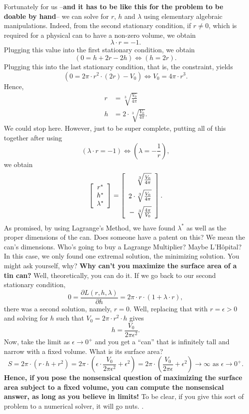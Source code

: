 Fortunately for us --\textbf{and it has to be like this for the problem to be doable by hand}-- we can solve for $r$, $h$ and $\lambda$ using elementary algebraic manipulations. Indeed, from the second stationary condition, if $r \neq 0$, which is required for a physical can to have a non-zero volume, we obtain 
$$
\lambda \cdot r = -1. 
$$
Plugging this value into the first  stationary condition, we obtain 
$$(0= h + 2r - 2 h ) \iff  (h = 2r).$$
Plugging this into the last stationary condition, that is, the constraint, yields
$$\left(  0 =  2 \pi \cdot r^2 \cdot (2 r) - V_0\right) \iff V_0 = 4 \pi \cdot r^3.$$
Hence, 
\begin{align*}
    r & = \sqrt[3]{\frac{V_0}{4 \pi}} \\
    h & = 2 \cdot \sqrt[3]{\frac{V_0}{4 \pi}}.
\end{align*}
We could stop here. However, just to be super complete, putting all of this together after using 
 $$( \lambda \cdot r = -1)  \iff \left(\lambda = - \frac{1}{r}\right),$$
 we obtain
$$\left[\begin{array}{c}
r^\ast\\
h ^\ast\\
\lambda^\ast \\
\end{array} \right] = \left[\begin{array}{r}
\sqrt[3]{\frac{V_0}{4 \pi}} \medskip \\
2 \cdot \sqrt[3]{\frac{V_0}{4 \pi}} \medskip \\
 - ~\sqrt[3]{\frac{4 \pi}{V_0}}\\
\end{array} \right] .$$
As promised, by using Lagrange's Method, we have found $\lambda^\ast$ as well as the proper dimensions of the can. Does someone have a patent on this? We mean the can's dimensions. Who's going to buy a Lagrange Multiplier? Maybe L'H\^opital? \\

In this case, we only found one extremal solution, the minimizing solution. You might ask yourself, why? \textbf{Why can't you maximize the surface area of a tin can?} Well, theoretically, you can do it. If we go back to our second stationary condition,
$$0 = \frac{ \partial L(r, h, \lambda)}{\partial h}= 2 \pi \cdot r \cdot ( 1 + \lambda \cdot r),$$
there was a second solution, namely, $r = 0$. Well, replacing that with $r = \epsilon>0$ and solving for $h$ such that 
$V_0 = 2 \pi \cdot r^2 \cdot h$ gives 
$$ h = \frac{V_0}{2 \pi \epsilon^2}.$$
Now, take the limit as $\epsilon \to 0^{+}$ and you get a ``can'' that is infinitely tall and narrow with a fixed volume. What is its surface area?
$$ S =2 \pi \cdot (r \cdot h + r^2) = 2 \pi \cdot (\epsilon  \cdot \frac{V_0}{2 \pi \epsilon^2} + \epsilon^2) = 2 \pi \cdot (\frac{V_0}{2 \pi \epsilon} + \epsilon^2) \to \infty \text{ as } \epsilon \to 0^+.$$
 \textbf{Hence, if you pose the nonsensical question of maximizing the surface area subject to a fixed volume, you can compute the nonsensical answer, as long as you believe in limits!} To be clear, if you give this sort of problem to a numerical solver, it will go nuts. 
\Qed. 
\\

